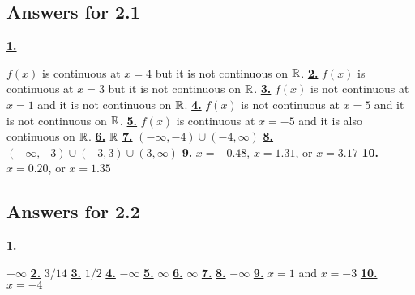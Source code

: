 \subsection *{Answers for 2.1}
\hypertarget {a:2.1.1}{\hyperlink {e:2.1.1}{\bfseries 1.}} \mdseries $f(x)$ is continuous at $x=4$ but it is not continuous on $\mathbb{R} $.\qquad 
\hypertarget {a:2.1.2}{\hyperlink {e:2.1.2}{\bfseries 2.}} \mdseries $f(x)$ is continuous at $x=3$ but it is not continuous on $\mathbb{R} $.\qquad 
\hypertarget {a:2.1.3}{\hyperlink {e:2.1.3}{\bfseries 3.}} \mdseries $f(x)$ is not continuous at $x=1$ and it is not continuous on $\mathbb{R} $.\qquad 
\hypertarget {a:2.1.4}{\hyperlink {e:2.1.4}{\bfseries 4.}} \mdseries $f(x)$ is not continuous at $x=5$ and it is not continuous on $\mathbb{R} $.\qquad 
\hypertarget {a:2.1.5}{\hyperlink {e:2.1.5}{\bfseries 5.}} \mdseries $f(x)$ is continuous at $x=-5$ and it is also continuous on $\mathbb{R} $.\qquad 
\hypertarget {a:2.1.6}{\hyperlink {e:2.1.6}{\bfseries 6.}} \mdseries $\mathbb{R} $\qquad 
\hypertarget {a:2.1.7}{\hyperlink {e:2.1.7}{\bfseries 7.}} \mdseries $(-\infty ,-4)\cup (-4,\infty )$\qquad 
\hypertarget {a:2.1.8}{\hyperlink {e:2.1.8}{\bfseries 8.}} \mdseries $(-\infty ,-3)\cup (-3,3)\cup (3,\infty )$\qquad 
\hypertarget {a:2.1.9}{\hyperlink {e:2.1.9}{\bfseries 9.}} \mdseries $x=-0.48$, $x=1.31$, or $x=3.17$\qquad 
\hypertarget {a:2.1.10}{\hyperlink {e:2.1.10}{\bfseries 10.}} \mdseries $x=0.20$, or $x=1.35$\qquad 
\subsection *{Answers for 2.2}
\hypertarget {a:2.2.1}{\hyperlink {e:2.2.1}{\bfseries 1.}} \mdseries $-\infty $\qquad 
\hypertarget {a:2.2.2}{\hyperlink {e:2.2.2}{\bfseries 2.}} \mdseries $3/14$\qquad 
\hypertarget {a:2.2.3}{\hyperlink {e:2.2.3}{\bfseries 3.}} \mdseries $1/2$\qquad 
\hypertarget {a:2.2.4}{\hyperlink {e:2.2.4}{\bfseries 4.}} \mdseries $-\infty $\qquad 
\hypertarget {a:2.2.5}{\hyperlink {e:2.2.5}{\bfseries 5.}} \mdseries $\infty $\qquad 
\hypertarget {a:2.2.6}{\hyperlink {e:2.2.6}{\bfseries 6.}} \mdseries $\infty $\qquad 
\hypertarget {a:2.2.7}{\hyperlink {e:2.2.7}{\bfseries 7.}} \qquad 
\hypertarget {a:2.2.8}{\hyperlink {e:2.2.8}{\bfseries 8.}} \mdseries $-\infty $\qquad 
\hypertarget {a:2.2.9}{\hyperlink {e:2.2.9}{\bfseries 9.}} \mdseries $x = 1$ and $x = -3$\qquad 
\hypertarget {a:2.2.10}{\hyperlink {e:2.2.10}{\bfseries 10.}} \mdseries $x = -4$\qquad 
